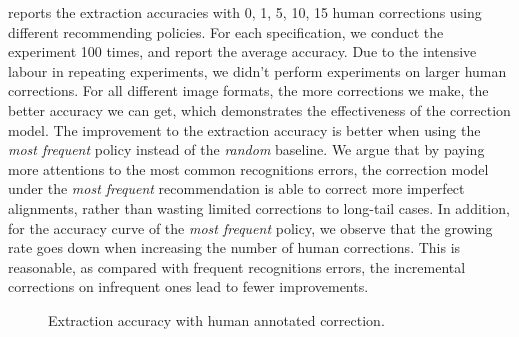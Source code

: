  reports the extraction accuracies
with 0, 1, 5, 10, 15 human corrections using different recommending policies.
For each specification, we conduct the experiment 100 times,
and report the average accuracy.
Due to the intensive labour in repeating experiments,
we didn't perform experiments on larger human corrections.
For all different image formats, the more corrections we make,
the better accuracy we can get,
which demonstrates the effectiveness of the correction model.
The improvement to the extraction accuracy is better when using the
\textit{most frequent} policy instead of the \textit{random} baseline.
We argue that by paying more attentions to the most common recognitions errors,
the correction model under the \textit{most frequent} recommendation
is able to correct more imperfect alignments,
rather than wasting limited corrections to long-tail cases.
In addition, for the accuracy curve of the \textit{most frequent} policy,
we observe that the growing rate goes down when increasing the number of
human corrections.
This is reasonable, as compared with frequent recognitions errors,
the incremental corrections on infrequent ones lead to fewer improvements.


%
%


\begin{figure*}[ht]
\centering
{}
{}
\hfill
{}
{}
\caption{Extraction accuracy with human annotated correction.}
\label{fig:humancorr}
\end{figure*}

